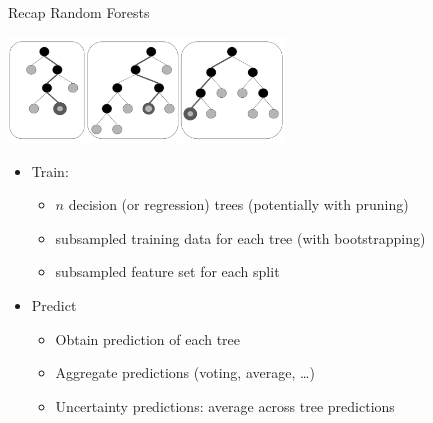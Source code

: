 \begin{frame}[c,fragile]{Recap Random Forests}


\centering
\includegraphics[width=0.55\textwidth]{images/random_forest_pic}

\begin{itemize}
  \item Train:
  \begin{itemize}
    \item $n$ decision (or regression) trees (potentially with pruning)
    \item subsampled training data for each tree (with bootstrapping)
    \item subsampled feature set for each split
  \end{itemize}
  \item Predict
  \begin{itemize}
    \item Obtain prediction of each tree
    \item Aggregate predictions (voting, average, \ldots)
    \pause
    \item Uncertainty predictions: average across tree predictions 
  \end{itemize}
\end{itemize}


\end{frame}
